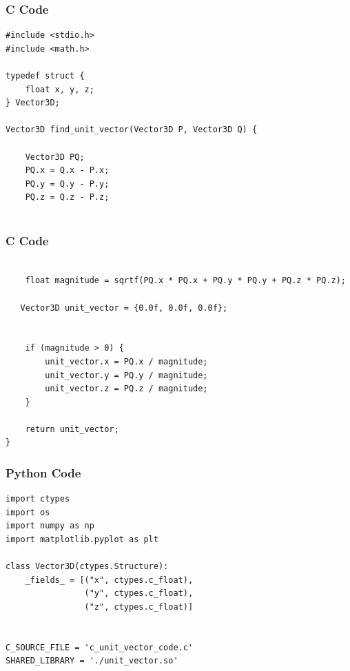 \documentclass{beamer}
\begin{document}
\begin{frame}[fragile]
    \frametitle{C Code}

    \begin{lstlisting}
#include <stdio.h>
#include <math.h> 

typedef struct {
    float x, y, z;
} Vector3D;

Vector3D find_unit_vector(Vector3D P, Vector3D Q) {

    Vector3D PQ;
    PQ.x = Q.x - P.x;
    PQ.y = Q.y - P.y;
    PQ.z = Q.z - P.z;
   
    \end{lstlisting}
\end{frame}
\begin{frame}[fragile]
    \frametitle{C Code}

    \begin{lstlisting}
     
    float magnitude = sqrtf(PQ.x * PQ.x + PQ.y * PQ.y + PQ.z * PQ.z);
   
   Vector3D unit_vector = {0.0f, 0.0f, 0.0f}; 

    
    if (magnitude > 0) {
        unit_vector.x = PQ.x / magnitude;
        unit_vector.y = PQ.y / magnitude;
        unit_vector.z = PQ.z / magnitude;
    }

    return unit_vector;
}

    \end{lstlisting}
\end{frame}

\begin{frame}[fragile]
    \frametitle{Python Code}
    \begin{lstlisting}
import ctypes
import os
import numpy as np
import matplotlib.pyplot as plt

class Vector3D(ctypes.Structure):
    _fields_ = [("x", ctypes.c_float),
                ("y", ctypes.c_float),
                ("z", ctypes.c_float)]


C_SOURCE_FILE = 'c_unit_vector_code.c'
SHARED_LIBRARY = './unit_vector.so'

    \end{lstlisting}
\end{frame}
\end{document}
